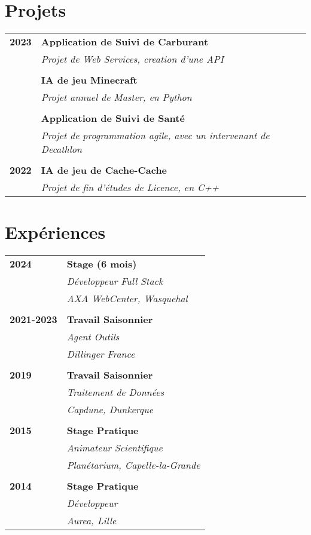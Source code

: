\documentclass[a4paper, 12pt]{article}
\begin{document}
\begin{minipage}[t]{0.65\textwidth}
		\section*{\textcolor{sectioncolor}{Projets}}
		\begin{tabular}{ m{} m{} }
			\textbf{2023} & \textbf{Application de Suivi de Carburant} \\
			& \textit{Projet de Web Services, creation d'une API} \\
			& \\
			& \textbf{IA de jeu Minecraft} \\
			& \textit{Projet annuel de Master, en Python} \\
			& \\
			& \textbf{Application de Suivi de Santé} \\
			& \textit{Projet de programmation agile, avec un intervenant de Decathlon} \\
			& \\
			\textbf{2022} & \textbf{IA de jeu de Cache-Cache} \\
			& \textit{Projet de fin d'études de Licence, en C++} \\
		\end{tabular}
		
		\vspace{-0.4cm}
		
		\section*{\textcolor{sectioncolor}{Expériences}}
		\begin{tabular}{ m{} m{} }
			\textbf{2024} & \textbf{Stage (6 mois)} \\
			& \textit{Développeur Full Stack} \\
			& \textit{AXA WebCenter, Wasquehal} \\
			& \\
			\textbf{2021-2023} & \textbf{Travail Saisonnier} \\
			& \textit{Agent Outils} \\
			& \textit{Dillinger France} \\
			& \\
			\textbf{2019} & \textbf{Travail Saisonnier} \\
			& \textit{Traitement de Données} \\
			& \textit{Capdune, Dunkerque} \\
			& \\
			\textbf{2015} & \textbf{Stage Pratique} \\
			& \textit{Animateur Scientifique} \\
			& \textit{Planétarium, Capelle-la-Grande} \\
			& \\
			\textbf{2014} & \textbf{Stage Pratique} \\
			& \textit{Développeur} \\
			& \textit{Aurea, Lille} \\
		\end{tabular}
		
	\end{minipage}
\end{document}
